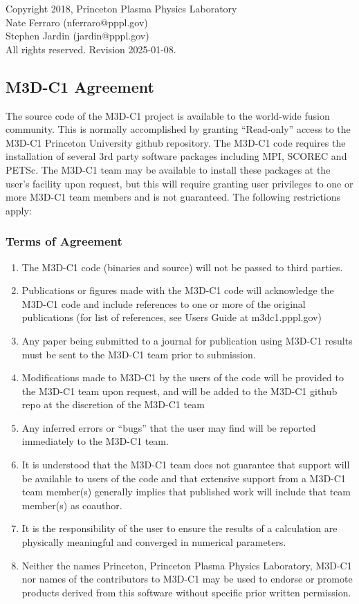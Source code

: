 \documentclass[10pt]{article}
\begin{document}
\noindent
Copyright 2018, Princeton Plasma Physics Laboratory\\
Nate Ferraro (nferraro@pppl.gov)\\
Stephen Jardin (jardin@pppl.gov)\\
All rights reserved.  Revision 2025-01-08.

\subsection*{M3D-C1 Agreement}
The source code of the M3D-C1 project is available to the world-wide
fusion community. This is normally accomplished by granting
``Read-only'' access to the M3D-C1 Princeton University github
repository. The M3D-C1 code requires the installation of several 3rd party
software packages including MPI, SCOREC and PETSc. The M3D-C1 team may
be available to install these packages at the user’s facility upon
request, but this will require granting user privileges to one or more
M3D-C1 team members and is not guaranteed. The following restrictions
apply:

\subsubsection*{Terms of Agreement}
\begin{enumerate}
\item The M3D-C1 code (binaries and source) will not be passed to
  third parties.
\item Publications or figures made with the M3D-C1 code will
  acknowledge the M3D-C1 code and include references to one or more of
  the original publications (for list of references, see Users Guide
  at m3dc1.pppl.gov)
\item Any paper being submitted to a journal for publication using
  M3D-C1 results must be sent to the M3D-C1 team prior to submission.
\item Modifications made to M3D-C1 by the users of the code will be
  provided to the M3D-C1 team upon request, and will be added to the
  M3D-C1 github repo at the discretion of the M3D-C1 team
\item Any inferred errors or ``bugs'' that the user may find will be
  reported immediately to the M3D-C1 team.
\item It is understood that the M3D-C1 team does not guarantee that
  support will be available to users of the code and that extensive
  support from a M3D-C1 team member(s) generally implies that
  published work will include that team member(s) as coauthor.
\item It is the responsibility of the user to ensure the results of a
  calculation are physically meaningful and converged in numerical
  parameters.
\item Neither the names Princeton, Princeton Plasma Physics
  Laboratory, M3D-C1 nor names of the contributors to M3D-C1 may be
  used to endorse or promote products derived from this software
  without specific prior written permission.
\end{enumerate}
\end{document}
